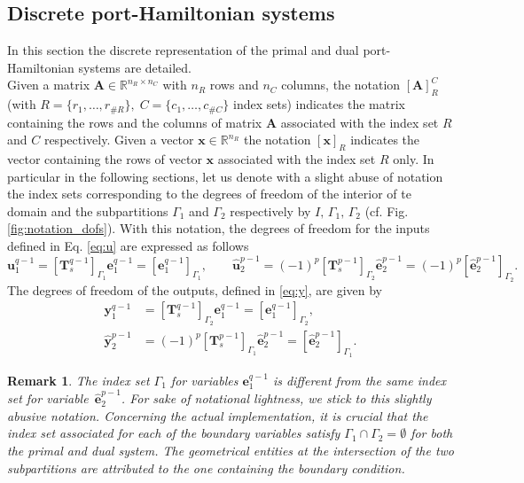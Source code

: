 \documentclass{elsarticle}
\newcommand{\revTwo}[1]{{\color{black}#1}}
\newtheorem{remark}{Remark}
\newcommand{\bbR}{\mathbb{R}}
\newcommand*{\dual}[1]{\ensuremath{\widehat{#1}}}
\begin{document}
\revTwo{
\subsection{Discrete port-Hamiltonian systems}
In this section the discrete representation of the primal and dual port-Hamiltonian systems are detailed. \\

Given a matrix $\mathbf{A} \in \bbR^{n_R \times n_C}$ with $n_R$ rows and $n_C$ columns, the notation $[\mathbf{A}]_{R}^C$ (with $R = \{r_1, \dots, r_{\# R}\}, \; C = \{c_1, \dots, c_{\# C}\}$ index sets) indicates the matrix containing the rows and the columns of matrix $\mathbf{A}$ associated with the index set $R$  and $C$ respectively. Given a vector $\mathbf{x} \in \bbR^{n_R}$ the notation $[\mathbf{x}]_{R}$ indicates the vector containing the rows of vector $\mathbf{x}$ associated with the index set $R$ only. In particular in the following sections, let us denote with a slight abuse of notation the index sets corresponding to the  degrees of freedom of the interior of te domain and the subpartitions ${\Gamma}_1$ and ${\Gamma}_2$ respectively by $I,\, \Gamma_1,\, \Gamma_2$  (cf. Fig. \ref{fig:notation_dofs}). With this notation, the degrees of freedom for the inputs defined in Eq. \eqref{eq:u} are expressed as follows
\begin{equation}\label{eq:dofs_u}
    \mathbf{u}^{q-1}_1 = [\mathbf{T}^{q-1}_{s}]_{\Gamma_1} \mathbf{e}^{q-1}_1 = [\mathbf{e}^{q-1}_1]_{\Gamma_1}, \qquad
    \dual{\mathbf{u}}^{p-1}_2 = (-1)^p[\mathbf{T}^{p-1}_{s}]_{\Gamma_2}\dual{\mathbf{e}}^{p-1}_2 = (-1)^p[\dual{\mathbf{e}}^{p-1}_2]_{\Gamma_2}.
\end{equation}
The degrees of freedom of the outputs, defined in \eqref{eq:y}, are given by
\begin{align}
    \mathbf{y}^{q-1}_1  &=  [\mathbf{T}^{q-1}_{s}]_{\Gamma_2} \mathbf{e}^{q-1}_1 = [\mathbf{e}^{q-1}_1]_{\Gamma_2}, \label{eq:dofs_y1}\\
    \dual{\mathbf{y}}^{p-1}_2 &= (-1)^p [\mathbf{T}^{p-1}_{s}]_{\Gamma_1} \dual{\mathbf{e}}^{p-1}_2 = [\dual{\mathbf{e}}^{p-1}_2]_{\Gamma_1}. \label{eq:dofs_y2}
\end{align}


\begin{remark}
The index set $\Gamma_1$ for variables $\mathbf{e}^{q-1}_1$ is different from the same index set for variable~$\dual{\mathbf{e}}^{p-1}_2$. For sake of notational lightness, we stick to this slightly abusive notation. Concerning the actual implementation, it is crucial that the index set associated for each of the boundary variables satisfy $\Gamma_1 \cap \Gamma_2 = \emptyset$ for both the primal and dual system. The geometrical entities at the intersection of the two subpartitions are attributed to the one containing the boundary condition. 
\end{remark}

}
\end{document}
